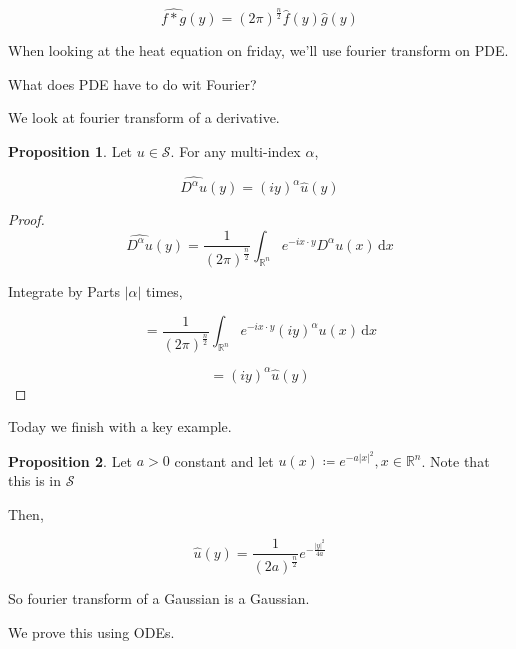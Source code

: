 \documentclass{article}
\theoremstyle{definition}
\newtheorem{proposition}{Proposition}
\begin{document}
\[
    \widehat{f\ast g}(y) = (2\pi)^{\frac{n}{2}}\widehat{f}(y)\widehat{g}(y)
\]

When looking at the heat equation on friday, we'll use fourier transform on PDE.

What does PDE have to do wit Fourier?

We look at fourier transform of a derivative.

\begin{proposition}
    Let \(u\in \mathcal{S}\). For any multi-index \(\alpha\),

    \[
        \widehat{D^\alpha u}(y) = (iy)^\alpha \widehat{u}(y)
    \]

\end{proposition}

\begin{proof}
    \[
        \widehat{D^\alpha u}(y) = \frac{1}{(2\pi )^\frac{n}{2}}\int_{\mathbb{R} ^n}^{} e^{-ix\cdot y} D^\alpha u(x) \,\mathrm{d}x 
    \]

    Integrate by Parts \(\vert \alpha \vert \) times,

    \[
        = \frac{1}{(2\pi)^{\frac{n}{2}}}\int_{\mathbb{R} ^n}^{} e^{-ix\cdot y} (iy)^\alpha u(x) \,\mathrm{d}x 
    \]

    \[
        = (iy)^{\alpha} \widehat{u}(y)
    \]

\end{proof}

Today we finish with a key example.

\begin{proposition}
    Let \(a > 0\) constant and let \(u(x)\coloneqq e^{-a \vert x \vert ^2},x\in\mathbb{R} ^n\). Note that this is in \(\mathcal{S}\) 

    Then,

    \[
        \hat{u}(y)=\frac{1}{(2a)^{\frac{n}{2}}}e^{-\frac{\vert y \vert ^2}{4a}}
    \]

    So fourier transform of a Gaussian is a Gaussian.

    We prove this using ODEs.

\end{proposition}
\end{document}
